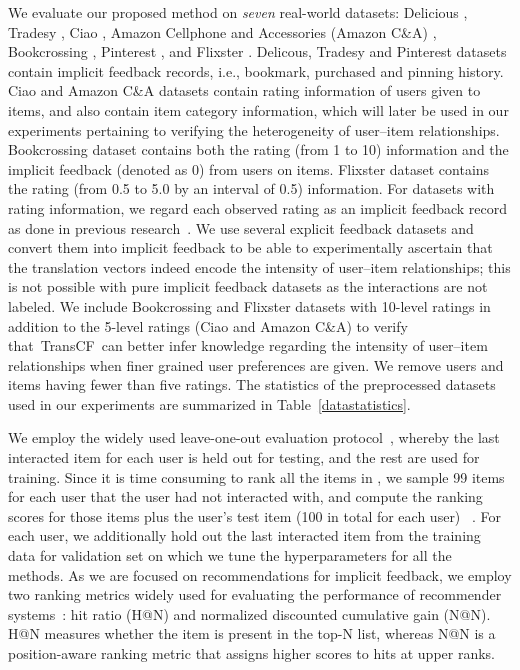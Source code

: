 \documentclass[conference]{IEEEtran}
\newcommand{\propose}{\textsf{{TransCF}}}
\begin{document}
We evaluate our proposed method on \textit{seven} real-world datasets: 
Delicious
\cite{Cantador:RecSys2011},
Tradesy
\cite{he2016vbpr},
Ciao
\cite{tang-etal12a},
Amazon Cellphone and Accessories (Amazon C\&A)
\cite{he2016ups},
Bookcrossing
\cite{ziegler2005improving},
Pinterest
\cite{geng2015learning},
and Flixster
\cite{jamali2010matrix}.
Delicous, Tradesy and Pinterest datasets contain implicit feedback records, i.e., bookmark, purchased and pinning history.
Ciao and Amazon C\&A datasets contain rating information of users given to items, and also contain item category information, which will later be used in our experiments pertaining to verifying the heterogeneity of user--item relationships.
Bookcrossing dataset contains both the rating (from 1 to 10) information and the implicit feedback (denoted as 0) from users on items. 
Flixster dataset contains the rating (from 0.5 to 5.0 by an interval of 0.5) information.
For datasets with rating information, we regard each observed rating as an implicit feedback record as done in previous research~\cite{rendle2009bpr,he2017neural,he2016vbpr,he2017translation,he2016ups,he2016fast,kabbur2013fism}.
We use several explicit feedback datasets and convert them into implicit feedback to be able to experimentally ascertain that the translation vectors indeed encode the intensity of user--item relationships; this is not possible with pure implicit feedback datasets as the interactions are not labeled.
We include Bookcrossing and Flixster datasets with 10-level ratings in addition to the 5-level ratings (Ciao and Amazon C\&A) to verify that~\propose~can better infer knowledge regarding the intensity of user--item relationships when finer grained user preferences are given.
We remove users and items having fewer than five ratings. The statistics of the preprocessed datasets used in our experiments are summarized in Table~\ref{datastatistics}.


\medskip
{}
We employ the widely used leave-one-out evaluation protocol~\cite{he2016vbpr,he2017neural,he2016fast,rendle2009bpr,he2017translation,xuedeep,he2016ups}, whereby  the last interacted item for each user is held out for testing, and the rest are used for training. Since it is time consuming to rank all the items in , we sample 99 items for each user that the user had not interacted with, and compute the ranking scores for those items plus the user's test item (100 in total  for each user) ~\cite{he2017neural,xuedeep}. For each user, we additionally hold out the last interacted item from the training data for validation set on which we tune the hyperparameters for all the methods.
As we are focused on recommendations for implicit feedback, we employ two ranking metrics widely used for evaluating the performance of recommender systems~\cite{he2017translation,he2017neural}: {hit ratio (H@N)} and {normalized discounted cumulative gain (N@N)}. H@N measures whether the item is present in the top-N list, whereas N@N is a position-aware ranking metric that assigns higher scores to hits at upper ranks. 
\end{document}
